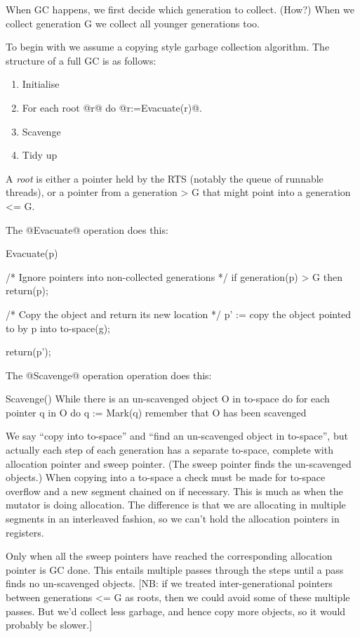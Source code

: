 \documentclass{article}
\newcommand{\segment}{segment}
\newcommand{\step}{step}
\begin{document}
When GC happens, we first decide which generation to collect.  (How?)
When we collect generation G we collect all younger generations too.

To begin with we assume a copying style garbage collection
algorithm.  The structure of a full GC is as follows:

\begin{enumerate}
\item Initialise
\item For each root @r@ do @r:=Evacuate(r)@.
\item Scavenge
\item Tidy up
\end{enumerate}

A {\em root} is either a pointer held by the RTS (notably the queue
of runnable threads), or a pointer from a generation > G that might
point into a generation <= G.

The @Evacuate@ operation does this:

\begin{code}
Evacuate(p) { 
  /* Ignore pointers into non-collected generations */
  if generation(p) > G then return(p);

  /* Copy the object and return its new location */
  p' := copy the object pointed to by p into to-space(g);

  return(p');
}
\end{code}
The @Scavenge@ operation operation does this:
\begin{code}
Scavenge() {
  While there is an un-scavenged object O in to-space do
	for each pointer q in O do
		q := Mark(q)
		remember that O has been scavenged
}
\end{code}
We say ``copy into to-space'' and ``find an un-scavenged object in to-space'',
but actually each \step{} of each generation has a separate to-space,
complete with allocation pointer and sweep pointer. (The sweep pointer
finds the un-scavenged objects.)  When copying
into a to-space a check must be made for to-space 
overflow and a new \segment{} chained on if necessary. 
This is much as when the 
mutator is doing allocation.  The difference is that we are allocating
in multiple \segment{}s in an interleaved fashion, so we can't hold
the allocation pointers in registers.

Only when all the sweep pointers
have reached the corresponding allocation pointer is GC done.
This entails multiple passes through the \step{}s until a pass 
finds no un-scavenged objects.  [NB: if we treated inter-generational pointers
between generations <= G as roots, then we could avoid some of these multiple
passes.  But we'd collect less garbage, and hence copy more
objects, so it would probably be slower.]  
\end{document}
